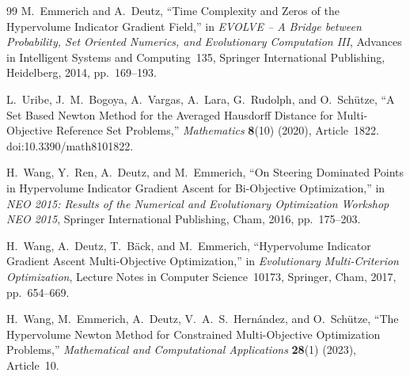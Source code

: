 \documentclass{article}
\begin{document}
\begin{thebibliography}{99}
M.~Emmerich and A.~Deutz,
``Time Complexity and Zeros of the Hypervolume Indicator Gradient Field,''
in \emph{EVOLVE -- A Bridge between Probability, Set Oriented Numerics, and Evolutionary Computation III},
Advances in Intelligent Systems and Computing~135, Springer International Publishing, Heidelberg, 2014, pp.~169--193.

L.~Uribe, J.~M.~Bogoya, A.~Vargas, A.~Lara, G.~Rudolph, and O.~Sch{\"u}tze,
``A Set Based Newton Method for the Averaged Hausdorff Distance for Multi-Objective Reference Set Problems,''
\emph{Mathematics} \textbf{8}(10) (2020), Article~1822. doi:10.3390/math8101822.

H.~Wang, Y.~Ren, A.~Deutz, and M.~Emmerich,
``On Steering Dominated Points in Hypervolume Indicator Gradient Ascent for Bi-Objective Optimization,''
in \emph{NEO 2015: Results of the Numerical and Evolutionary Optimization Workshop NEO 2015},
Springer International Publishing, Cham, 2016, pp.~175--203.

H.~Wang, A.~Deutz, T.~B{\"a}ck, and M.~Emmerich,
``Hypervolume Indicator Gradient Ascent Multi-Objective Optimization,''
in \emph{Evolutionary Multi-Criterion Optimization},
Lecture Notes in Computer Science~10173, Springer, Cham, 2017, pp.~654--669.

H.~Wang, M.~Emmerich, A.~Deutz, V.~A.~S.~Hern{\'a}ndez, and O.~Sch{\"u}tze,
``The Hypervolume Newton Method for Constrained Multi-Objective Optimization Problems,''
\emph{Mathematical and Computational Applications} \textbf{28}(1) (2023), Article~10.

\end{thebibliography}
\end{document}
